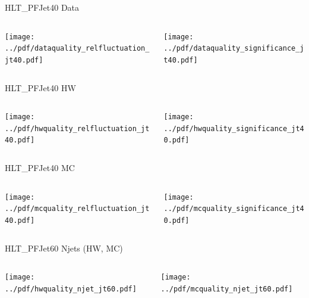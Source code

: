 \documentclass[9pt]{beamer}
\begin{document}
\begin{frame}[t]{HLT\_PFJet40 Data}
\begin{columns}[T]
  \begin{column}{.5\textwidth}
  \texttt{[image: ../pdf/dataquality\_relfluctuation\_jt40.pdf]}
  \end{column}
  \begin{column}{.5\textwidth}
  \texttt{[image: ../pdf/dataquality\_significance\_jt40.pdf]}
  \end{column}
\end{columns}
\end{frame}

\begin{frame}[t]{HLT\_PFJet40 HW}
\begin{columns}[T]
  \begin{column}{.5\textwidth}
  \texttt{[image: ../pdf/hwquality\_relfluctuation\_jt40.pdf]}
  \end{column}
  \begin{column}{.5\textwidth}
  \texttt{[image: ../pdf/hwquality\_significance\_jt40.pdf]}
  \end{column}
\end{columns}
\end{frame}

\begin{frame}[t]{HLT\_PFJet40 MC}
\begin{columns}[T]
  \begin{column}{.5\textwidth}
  \texttt{[image: ../pdf/mcquality\_relfluctuation\_jt40.pdf]}
  \end{column}
  \begin{column}{.5\textwidth}
  \texttt{[image: ../pdf/mcquality\_significance\_jt40.pdf]}
  \end{column}
\end{columns}
\end{frame}

\begin{frame}[t]{HLT\_PFJet60 Njets (HW, MC)}
\begin{columns}[T]
  \begin{column}{.5\textwidth}
  \texttt{[image: ../pdf/hwquality\_njet\_jt60.pdf]}
  \end{column}
  \begin{column}{.5\textwidth}
  \texttt{[image: ../pdf/mcquality\_njet\_jt60.pdf]}
  \end{column}
\end{columns}
\end{frame}
\end{document}
